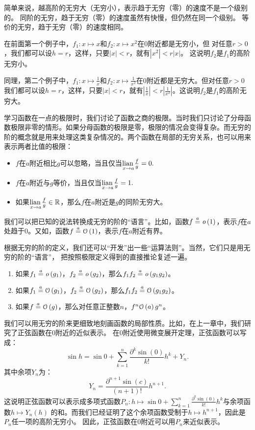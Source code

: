 \documentclass[12pt,UTF8]{ctexbook}
\begin{document}
简单来说，越高阶的无穷大（无穷小），表示趋于无穷（零）的速度不是一个级别的。
同阶的无穷，趋于无穷（零）的速度虽然有快慢，但仍然在同一个级别。
等价的无穷，趋于无穷（零）的速度相同。

在前面第一个例子中，$f_1: x\mapsto x$和$f_2: x\mapsto x^2$在$0$附近都是无穷小，但
对任意$r > 0$，我们都可以设$h = r$，这样，只要$|x| < r$，就有$|x^2| < r|x|$。
这说明$f_2$是$f_1$的高阶无穷小。

同理，第二个例子中，$f_1: x\mapsto \frac{1}{x}$和$f_2: x\mapsto \frac{1}{x^2}$在$0$附近都是无穷大。但对任意$r > 0$我们都可以设$h = r$，这样，只要$|x| < r$，就有$|\frac{1}{x}| < r|\frac{1}{x^2}|$。这说明$f_2$是$f_1$的高阶无穷大。

学习函数在一点的极限时，我们讨论了函数之商的极限。当时我们只讨论了分母函数极限非零的情形。如果分母函数的极限是零，极限的情况会变得复杂。而无穷的阶的概念就是用来处理这类复杂情况的。两个函数在局部的无穷关系，也可以用来表示两者比值的极限：
\begin{itemize}
    \item $f$在$a$附近相比$g$可以忽略，当且仅当$\underset{x\to a}{\operatorname{lian}\,} \frac{f}{g} = 0.$
    \item $f$在$a$附近与$g$等价，当且仅当$\underset{x\to a}{\operatorname{lian}\,} \frac{f}{g} = 1.$
    \item 如果$\underset{x\to a}{\operatorname{lian}\,} \frac{f}{g} \in \mathbb{R}$，那么$f$在$a$附近是$g$的同阶无穷大。
\end{itemize}

我们可以把已知的说法转换成无穷的阶的“语言”。比如，函数$f \overset{a}{=} \mathit{o}\left(1\right)$，表示$f$在$a$处趋于$0$。又如，函数$f \overset{a}{=} \mathcal{O}\left(1\right)$，表示$f$在$a$附近有界。

根据无穷的阶的定义，我们还可以“开发”出一些“运算法则”。当然，它们只是用无穷的阶的“语言”，
把按照极限定义得到的直接推论复述一遍。
\begin{enumerate}
    \item 如果$f_1 \overset{a}{=} \mathit{o}\left(g_1\right)$，$f_2 \overset{a}{=} \mathit{o}\left(g_2\right)$，那么$f_1 f_2 \overset{a}{=} \mathit{o}\left(g_1 g_2\right)$。
    \item 如果$f_1 \overset{a}{=} \mathcal{O}\left(g_1\right)$，$f_2 \overset{a}{=} \mathcal{O}\left(g_2\right)$，那么$f_1 f_2 \overset{a}{=} \mathcal{O}\left(g_1 g_2\right)$。
    \item 如果$f \overset{a}{=} \mathcal{O}\left(g\right)$，那么对任意正整数$n$，$f^n \mathcal{O}\left(a\right){g^n}$。
\end{enumerate}

我们可以用无穷的阶来更细致地刻画函数的局部性质。比如，在上一章中，我们研究了正弦函数在$0$附近的近似表示。
在$0$附近使用微变展开定理，正弦函数可以写成：
$$ \sin{h} = \sin{0} + \sum_{k=1}^n \frac{\partial^k \sin (0)}{k!}h^k + Y_n. $$
其中余项$Y_n$为：
$$ Y_n = \frac{\partial^{n+1} \sin (c)}{(n+1)!}h^{n+1}. $$
这说明正弦函数可以表示成多项式函数$P_n :h \mapsto \sin{0} + \sum_{k=1}^n \frac{\partial^k \sin (0)}{k!}h^k$与余项函数$h\mapsto Y_n(h)$
的和。而我们已经证明了这个余项函数受制于$h\mapsto h^{n+1}$，因此是$P_n$任一项的高阶无穷小。
因此，正弦函数在$0$附近可以用$P_n$来近似表示。
\end{document}
